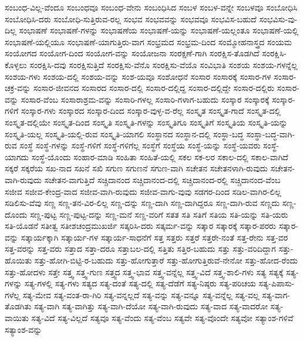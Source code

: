 {ಸಂಬಂಧ-ವಿಲ್ಲ-ವೆಂದೂ
ಸಂಬಂಧವೂ
ಸಂಬಂಧ-ವೇನು
ಸಂಬಂಧಿಸಿದ
ಸಂಬಳ
ಸಂಬಳ-ವನ್ನೇ
ಸಂಬಳವೂ
ಸಂಬೋಧಿಸಿ
ಸಂಬೋಧಿಸಿ-ದರು
ಸಂಬೋಧಿ-ಸುತ್ತಿರುವ-ರಲ್ಲ
ಸಂಭವ
ಸಂಭವವನ್ನು
ಸಂಭವವೂ
ಸಂಭವಿಸ-ಬಹುದೆ
ಸಂಭವಿಸು-ವು-ದಿಲ್ಲ
ಸಂಭಾಷಣೆ
ಸಂಭಾಷಣೆ-ಗಳನ್ನು
ಸಂಭಾಷಣೆಯ
ಸಂಭಾಷಣೆ-ಯನ್ನು
ಸಂಭಾಷಣೆ-ಯಲ್ಲಂತೂ
ಸಂಭಾಷಣೆ-ಯಲ್ಲಿ
ಸಂಭಾಷಣೆ-ಯಲ್ಲಿಯೂ
ಸಂಭಾಷಣೆ-ಯಾಗುತ್ತಿರು-ವಾಗ
ಸಂಭ್ರಮದ
ಸಂಭ್ರಮ-ದಿಂದ
ಸಂಮ್ಮೋಹನಾಸ್ತ್ರದ
ಸಂಯಮ
ಸಂಯೋಗದ
ಸಂಯೋಗ-ದಿಂದ
ಸಂಯೋಗ-ವನ್ನು
ಸಂಯೋಜನಾ
ಸಂರಕ್ಷಣೆ-ಗಾಗಿ
ಸಂರಕ್ಷಿಸ-ತೊಡಗಿದೆ
ಸಂರಕ್ಷಿಸಿ-ಕೊಳ್ಳಲು
ಸಂರಕ್ಷಿಸಿ-ದವು
ಸಂರಕ್ಷಿಸುತ್ತಿದೆ
ಸಂರಕ್ಷಿಸು-ವೆನೊ
ಸಂರಕ್ಷಿಸು-ವೆಯೊ
ಸಂವಿಭಾತಿ
ಸಂಶಯ
ಸಂಶಯ-ಗಳನ್ನೆಲ್ಲ
ಸಂಶಯ-ಗಳು
ಸಂಶಯ-ದಲ್ಲಿ
ಸಂಶಯ-ವನ್ನು
ಸಂಶ-ಯವೂ
ಸಂಶೋಧನೆ
ಸಂಸಾರ
ಸಂಸಾರಕ್ಕೆ
ಸಂಸಾರ-ಗಳ
ಸಂಸಾರ-ಚಕ್ರ-ವನ್ನು
ಸಂಸಾರ-ಜೀವನದ
ಸಂಸಾರದ
ಸಂಸಾರ-ದಲ್ಲಿ
ಸಂಸಾರ-ದಲ್ಲಿದ್ದ
ಸಂಸಾರ-ದಲ್ಲಿದ್ದೇ
ಸಂಸಾರ-ದಲ್ಲಿರು
ಸಂಸಾರ-ವನ್ನು
ಸಂಸಾರ-ವೆಂಬ
ಸಂಸಾರಾಶ್ರಮ-ವನ್ನು
ಸಂಸಾರಿ-ಗಳಲ್ಲ
ಸಂಸಾರಿ-ಗಳಾಗ-ಬಹುದು
ಸಂಸ್ಕಾರ
ಸಂಸ್ಕಾರಕ್ಕೆ
ಸಂಸ್ಕಾರ-ಗಳಿಗೆ
ಸಂಸ್ಕಾರ-ಗಳು
ಸಂಸ್ಕಾರದ
ಸಂಸ್ಕಾರ-ದಿಂದ
ಸಂಸ್ಕಾರ-ವುಳ್ಳ-ವ-ರೆಲ್ಲ
ಸಂಸ್ಕೃತ
ಸಂಸ್ಕೃತ-ಗಾದೆ
ಸಂಸ್ಕೃತ-ದಲ್ಲಿ
ಸಂಸ್ಕೃತ-ದಲ್ಲಿಯೇ
ಸಂಸ್ಕೃತ-ದಿಂದ
ಸಂಸ್ಕೃತಿ
ಸಂಸ್ಕೃತಿ-ಗಳನ್ನು
ಸಂಸ್ಕೃತಿಗೂ
ಸಂಸ್ಕೃತಿಗೆ
ಸಂಸ್ಕೃತಿಯ
ಸಂಸ್ಕೃತಿ-ಯನ್ನು
ಸಂಸ್ಕೃತಿ-ಯಲ್ಲ
ಸಂಸ್ಕೃತಿ-ಯಲ್ಲಿ-ರುವ
ಸಂಸ್ಕೃತಿ-ಯಾಗಲಿ
ಸಂಸ್ಥಾನದ
ಸಂಸ್ಥಾನ-ದಲ್ಲಿ
ಸಂಸ್ಥಾ-ಬದ್ಧ
ಸಂಸ್ಥಾ-ಬದ್ಧ-ವಾಗಿ-ರುವ
ಸಂಸ್ಥೆ
ಸಂಸ್ಥೆ-ಗಳನ್ನು
ಸಂಸ್ಥೆ-ಗಳಿಗೆ
ಸಂಸ್ಥೆ-ಗಳಿಗೆಲ್ಲ
ಸಂಸ್ಥೆಗೆ
ಸಂಸ್ಥೆಯ
ಸಂಸ್ಥೆ-ಯನ್ನು
ಸಂಸ್ಥೆ-ಯವರು
ಸಂಸ್ಥೆ-ಯಾಗದು
ಸಂಸ್ಥೆ-ಯೊಂದು
ಸಂಹಾರ-ಮಾಡಿ
ಸಂಹಿತಾ
ಸಂಹಿತೆ-ಯಲ್ಲಿ
ಸಕಲ
ಸಕ-ಲರ
ಸಕಾಲ-ದಲ್ಲಿ
ಸಕಾಲ-ವಾಗಿದೆ
ಸಕ್ಕರೆ
ಸಕ್ಕರೆಯ
ಸಖ-ನಾದ
ಸಖನೆ
ಸಖಿ
ಸಗುಣ
ಸಗುಣನೆ
ಸಗುಣ-ವಾಗಿ
ಸಚೇತನ
ಸಚೇತನಳಾಗಿ-ರುವುದು
ಸಚೇತನ-ವಾಗಿ-ರುವುದು
ಸಚೇತನ-ವಾಗುತ್ತಿದೆ
ಸಚ್ಚಿದಾನಂದ
ಸಚ್ಚಿದಾನಂದ-ದಲ್ಲಿ
ಸಚ್ಚಿದಾನಂದ-ರಲ್ಲಿ
ಸಚ್ಚಿದಾನಂದ-ವೆಂಬ
ಸಜೀವ
ಸಜೀವ-ಕೇಂದ್ರ-ವಾದ
ಸಜೀವ-ವಾಗಿ-ರುವುದು
ಸಜೀವ-ವಾಗು-ವುವು
ಸಡಗರ-ದಿಂದ
ಸಡಿಲ-ವಾಗಿರ-ಲಿಲ್ಲ
ಸಡಿಲಿಸು-ವೆವು
ಸಣ್ಣ
ಸಣ್ಣ-ತನ-ವಿರ-ಲಿಲ್ಲ
ಸಣ್ಣ-ದನ್ನು
ಸಣ್ಣ-ದಾಗಿ
ಸಣ್ಣ-ದಾಗಿದ್ದರೂ
ಸಣ್ಣ-ದಾಗಿ-ರುವ
ಸಣ್ಣದು
ಸಣ್ಣ-ದೊಂದು
ಸಣ್ಣ-ಪುಟ್ಟ
ಸಣ್ಣ-ಪುಟ್ಟ-ದನ್ನು
ಸಣ್ಣ-ಮನೆ
ಸಣ್ಣ-ವರಿಗೆ
ಸತತ
ಸತಿ
ಸತಿಗೆ
ಸತಿಯ
ಸತಿ-ಯನ್ನು
ಸತಿ-ಯರು
ಸತಿ-ಯೊಡನೆ
ಸತೀತ್ವ
ಸತೀಶಚಂದ್ರಮುಖರ್ಜಿ
ಸತ್ಕರಿಸಿ-ದರು
ಸತ್ಕರ್ಮ-ವನ್ನು
ಸತ್ಕಾರ
ಸತ್ಕಾರಕ್ಕೆ
ಸತ್ಕಾರ-ಪರರು
ಸತ್ಕಾರ-ವನ್ನು
ಸತ್ಕಾರ್ಯಕ್ಕಾಗಿ
ಸತ್ಕಾರ್ಯ-ಗಳ
ಸತ್ಕಾರ್ಯ-ಸಾಧನೆಗೆ
ಸತ್ತ
ಸತ್ತರು
ಸತ್ತರೆ
ಸತ್ತರೇ-ನಂತೆ
ಸತ್ತ-ರೇನು
ಸತ್ತ-ವರ
ಸತ್ತ-ವರನ್ನು
ಸತ್ತ-ವರು
ಸತ್ತಾದ
ಸತ್ತಾ-ದರೂ
ಸತ್ತಾಬಲ-ದಲ್ಲಿ
ಸತ್ತಿತು
ಸತ್ತಿರ-ಬಹುದು
ಸತ್ತು
ಸತ್ತು-ವರಿದಿದ್ದಾಗ
ಸತ್ತು-ಹೊಯಿತು
ಸತ್ತು-ಹೋಗಿ-ಬಿಟ್ಟಿ-ರ-ಬಹುದು
ಸತ್ತು-ಹೋಗುತ್ತಾರೆ
ಸತ್ತು-ಹೋಗುತ್ತಿರುವೆ-ನೇನೋ
ಸತ್ತು-ಹೋದ-ರೆಂದು
ಸತ್ತು-ಹೋದಳು
ಸತ್ತೇ
ಸತ್ತ್ವ
ಸತ್ತ್ವ-ಗುಣ
ಸತ್ತ್ವದ
ಸತ್ತ್ವ-ಭಾವ
ಸತ್ತ್ವ-ವನ್ನೆಲ್ಲ
ಸತ್ತ್ವ-ವಿದೆ
ಸತ್ತ್ವ-ಶಾಲಿ-ಗಳು
ಸತ್ಯ
ಸತ್ಯಕ್ಕೆ
ಸತ್ಯ-ಗಳನ್ನು
ಸತ್ಯ-ಗಳಲ್ಲಿ
ಸತ್ಯ-ಗಳು
ಸತ್ಯದ
ಸತ್ಯ-ದಂತೆ
ಸತ್ಯ-ದಲ್ಲಿ
ಸತ್ಯ-ದೆಡೆಗೆ
ಸತ್ಯ-ನಿಷ್ಠರು
ಸತ್ಯ-ಪರಿಚಯ
ಸತ್ಯ-ಪಿಪಾಸು-ಗಳೆಲ್ಲ
ಸತ್ಯ-ಮೇವ
ಸತ್ಯ-ವಂತ-ರಾ-ಗಿರಿ
ಸತ್ಯ-ವನ್ನಲ್ಲದೆ
ಸತ್ಯ-ವನ್ನು
ಸತ್ಯ-ವನ್ನೂ
ಸತ್ಯ-ವನ್ನೆಲ್ಲ
ಸತ್ಯ-ವಲ್ಲ
ಸತ್ಯ-ವಾಗ-ತೊಡಗಿತು
ಸತ್ಯ-ವಾಗಿ
ಸತ್ಯ-ವಾಗಿತ್ತು
ಸತ್ಯ-ವಾಗಿ-ದೆಯೋ
ಸತ್ಯ-ವಾಗಿ-ರುವುದು
ಸತ್ಯ-ವಾದ
ಸತ್ಯ-ವಾದರೋ
ಸತ್ಯ-ವಾಯಿತು
ಸತ್ಯ-ವಿದೆ
ಸತ್ಯ-ವಿಲ್ಲದೆ
ಸತ್ಯವೂ
ಸತ್ಯ-ವೆಂದು
ಸತ್ಯ-ವೆಂಬ
ಸತ್ಯವೇ
ಸತ್ಯ-ವೊಂದೇ
ಸತ್ಯವೋ
ಸತ್ಯಾಂಶ-ಗಳಿವೆ
ಸತ್ಯಾಂಶ-ವನ್ನು
}
